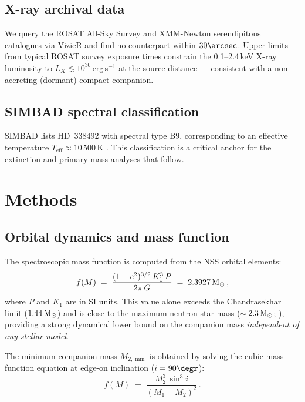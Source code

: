 \documentclass[usenatbib,fleqn]{mnras}
\newcommand{\Msun}{{\rm M}_\odot}
\newcommand{\fmass}{f(M)}
\begin{document}
\subsection{X-ray archival data}
\label{sec:data:xray}

We query the ROSAT All-Sky Survey and XMM-Newton serendipitous
catalogues via VizieR and find no counterpart within
$30\arcsec$.  Upper limits from typical ROSAT survey exposure
times constrain the 0.1--2.4\,keV X-ray luminosity to
$L_X \lesssim 10^{30}$\,erg\,s$^{-1}$ at the source distance ---
consistent with a non-accreting (dormant) compact companion.

\subsection{SIMBAD spectral classification}
\label{sec:data:spt}

SIMBAD lists HD~338492 with spectral type B9, corresponding to an
effective temperature $T_\mathrm{eff} \approx 10\,500$\,K
\citep{PecautMamajek2013}.  This classification is a critical
anchor for the extinction and primary-mass analyses that follow.

\section{Methods}
\label{sec:methods}

\subsection{Orbital dynamics and mass function}
\label{sec:methods:orbit}

The spectroscopic mass function is computed from the NSS orbital
elements:
\begin{equation}
\fmass \;=\; \frac{(1 - e^2)^{3/2}\, K_1^3\, P}{2\pi\, G}
     \;=\; 2.3927\,\Msun \,,
\label{eq:fm}
\end{equation}
where $P$ and $K_1$ are in SI units.  This value alone exceeds the
Chandrasekhar limit ($1.44\,\Msun$) and is close to the maximum
neutron-star mass ($\sim$\,$2.3\,\Msun$;
\citealt{Rezzolla2018}), providing a strong dynamical lower bound
on the companion mass \emph{independent of any stellar model}.

The minimum companion mass $M_{2,\min}$ is obtained by solving the
cubic mass-function equation at edge-on inclination ($i = 90\degr$):
\begin{equation}
\fmass \;=\; \frac{M_2^3\, \sin^3 i}{(M_1 + M_2)^2} \,.
\label{eq:fm_cubic}
\end{equation}
\end{document}
